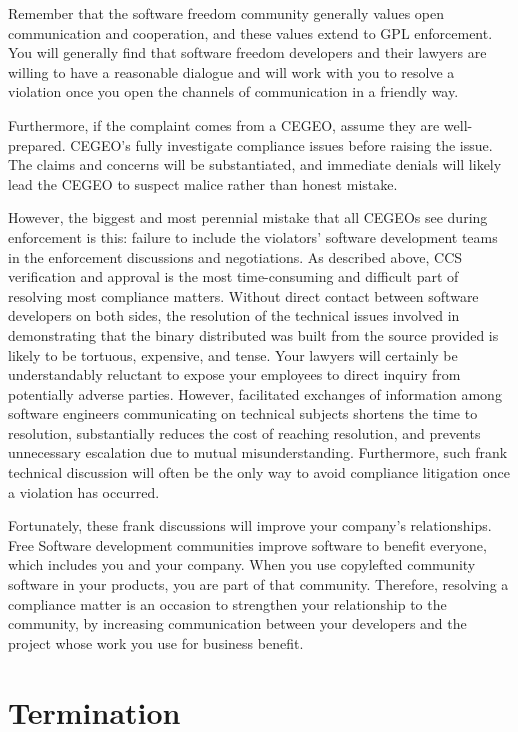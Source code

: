 Remember that the software freedom community generally values open communication and
cooperation, and these values extend to GPL enforcement.  You will
generally find that software freedom developers and their lawyers are willing to
have a reasonable dialogue and will work with you to resolve a violation
once you open the channels of communication in a friendly way.

Furthermore, if the complaint comes from a CEGEO, assume they are
well-prepared.  CEGEO's fully investigate compliance issues before raising
the issue.  The claims and concerns will be substantiated, and immediate
denials will likely lead the CEGEO to suspect malice rather than honest
mistake.

However, the biggest and most perennial mistake that all CEGEOs see during
enforcement is this: failure to include the violators' software development
teams in the enforcement discussions and negotiations.  As described above,
CCS verification and approval is the most time-consuming and difficult part
of resolving most compliance matters.  Without direct contact between
software developers on both sides, the resolution of the technical issues
involved in demonstrating that the binary distributed was built from the
source provided is likely to be tortuous, expensive, and tense. Your lawyers
will certainly be understandably reluctant to expose your employees to direct
inquiry from potentially adverse parties.  However, facilitated exchanges of
information among software engineers communicating on technical subjects
shortens the time to resolution, substantially reduces the cost of reaching
resolution, and prevents unnecessary escalation due to mutual
misunderstanding.  Furthermore, such frank technical discussion will often be
the only way to avoid compliance litigation once a violation has occurred.

Fortunately, these frank discussions will improve your company's
relationships.  Free Software development communities improve software to
benefit everyone, which includes you and your company.  When you use
copylefted community software in your products, you are part of that
community.  Therefore, resolving a compliance matter is an occasion to
strengthen your relationship to the community, by increasing communication
between your developers and the project whose work you use for business
benefit.

\section{Termination}

